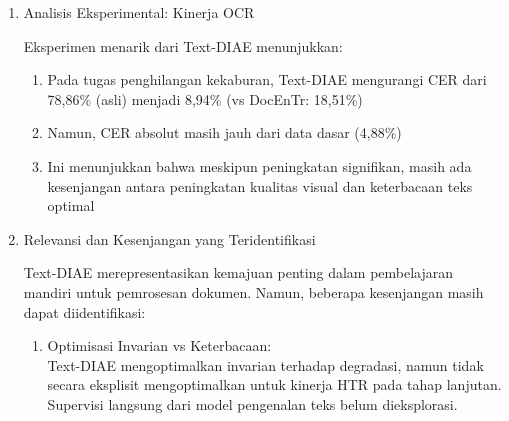 \begin{enumerate}[leftmargin=*, labelsep=0.5em, itemindent=0pt, label=\arabic*., topsep=0pt, partopsep=0pt]
\begin{enumerate}[leftmargin=1.5em, labelsep=0.5em, itemindent=0pt, label=\alph*., topsep=0pt, parsep=0pt, itemsep=0pt]
      \item Keterbatasan Degradasi Sintetis: \mbox{}\\[0.1em]
            Prapelatihan menggunakan degradasi sintetis (penutupan, kekaburan, derau) yang mungkin tidak menangkap karakteristik kompleks dari degradasi alami dokumen historis seperti tembusan, bercak cokelat, atau degradasi kimia.

      \item Ketiadaan Pelatihan Adversarial: \mbox{}\\[0.1em]
            Tanpa komponen adversarial, Text-DIAE cenderung menghasilkan keluaran yang terlalu halus. Hal ini terlihat dari perbandingan kualitatif dengan DocEnTr, yaitu Text-DIAE menghasilkan tekstur yang kurang realistis.

      \item Kompleksitas Komputasi: \mbox{}\\[0.1em]
            Kompleksitas kuadratik dari mekanisme \textit{self-attention} membuatnya kurang praktis untuk dokumen historis beresolusi tinggi yang umum dalam arsip.
\end{enumerate}

\item Analisis Eksperimental: Kinerja OCR

Eksperimen menarik dari Text-DIAE menunjukkan:
\begin{enumerate}[leftmargin=1.5em, labelsep=0.5em, itemindent=0pt, label=\alph*., topsep=0pt, parsep=0pt, itemsep=0pt]
      \item Pada tugas penghilangan kekaburan, Text-DIAE mengurangi CER dari 78,86\% (asli) menjadi 8,94\% (vs DocEnTr: 18,51\%)
      \item Namun, CER absolut masih jauh dari data dasar (4,88\%)
      \item Ini menunjukkan bahwa meskipun peningkatan signifikan, masih ada kesenjangan antara peningkatan kualitas visual dan keterbacaan teks optimal
\end{enumerate}

\item Relevansi dan Kesenjangan yang Teridentifikasi
\label{para:textdiae-kesenjangan}

Text-DIAE merepresentasikan kemajuan penting dalam pembelajaran mandiri untuk pemrosesan dokumen. Namun, beberapa kesenjangan masih dapat diidentifikasi:

\begin{enumerate}[leftmargin=1.5em, labelsep=0.5em, itemindent=0pt, label=\alph*., topsep=0pt, parsep=0pt, itemsep=0pt]
      \item Optimisasi Invarian vs Keterbacaan: \mbox{}\\[0.1em]
            Text-DIAE mengoptimalkan invarian terhadap degradasi, namun tidak secara eksplisit mengoptimalkan untuk kinerja HTR pada tahap lanjutan. Supervisi langsung dari model pengenalan teks belum dieksplorasi.


\end{enumerate}
\end{enumerate}
